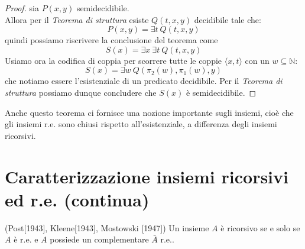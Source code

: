 \begin{proof}
sia $P(x,y)$ semidecidibile.\\
Allora per il \textit{Teorema di struttura} esiste $Q(t,x,y)$ decidibile tale che:
$$P(x,y) = \exists t\ Q(t,x,y)$$
quindi possiamo riscrivere la conclusione del teorema come
$$S(x) = \exists x\ \exists t\ Q(t,x,y)$$
Usiamo ora la codifica di coppia per scorrere tutte le coppie $\langle x,t \rangle$ con un $w\subseteq\mathbb{N}$:
$$S(x) = \exists w\ Q(\pi_{2}(w),\pi_{1}(w),y)$$
che notiamo essere l'esistenziale di un predicato decidibile.
Per il \textit{Teorema di struttura} possiamo dunque concludere che $S(x)$ \`{e} semidecidibile.
\end{proof}
Anche questo teorema ci fornisce una nozione importante sugli insiemi, cio\`{e} che gli insiemi r.e. sono chiusi rispetto all'esistenziale, a differenza degli insiemi ricorsivi.

%
%

\section{Caratterizzazione insiemi ricorsivi ed r.e. (continua)}

\begin{thm}
 \label{thm:2}
(Post[1943], Kleene[1943], Mostowski [1947]) Un insieme $A$ \`e ricorsivo se e solo se $A$ \`e r.e. e $A$ possiede un complementare $\bar{A}$ r.e..
\end{thm}

